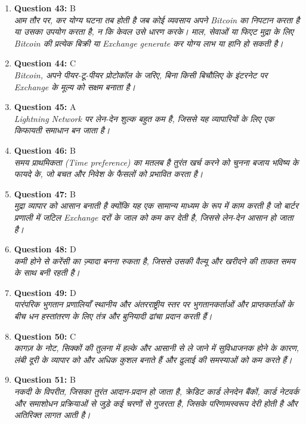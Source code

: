 \documentclass[12pt,a4paper]{article}
\begin{document}
\begin{enumerate}
\item \textbf{Question 43:} B
\\ \textit{आम तौर पर, कर योग्य घटना तब होती है जब कोई व्यवसाय अपने Bitcoin का निपटान करता है या उसका उपयोग करता है, न कि केवल उसे धारण करके। माल, सेवाओं या फिएट मुद्रा के लिए Bitcoin की प्रत्येक बिक्री या Exchange generate कर योग्य लाभ या हानि हो सकती है।}

\item \textbf{Question 44:} C
\\ \textit{Bitcoin, अपने पीयर-टू-पीयर प्रोटोकॉल के जरिए, बिना किसी बिचौलिए के इंटरनेट पर Exchange के मूल्य को सक्षम बनाता है।}

\item \textbf{Question 45:} A
\\ \textit{Lightning Network पर लेन-देन शुल्क बहुत कम है, जिससे यह व्यापारियों के लिए एक किफायती समाधान बन जाता है।}

\item \textbf{Question 46:} B
\\ \textit{समय प्राथमिकता (Time preference) का मतलब है तुरंत खर्च करने को चुनना बजाय भविष्य के फायदे के, जो बचत और निवेश के फैसलों को प्रभावित करता है।}

\item \textbf{Question 47:} B
\\ \textit{मुद्रा व्यापार को आसान बनाती है क्योंकि यह एक सामान्य माध्यम के रूप में काम करती है जो बार्टर प्रणाली में जटिल Exchange दरों के जाल को कम कर देती है, जिससे लेन-देन आसान हो जाता है।}

\item \textbf{Question 48:} D
\\ \textit{कमी होने से करेंसी का ज़्यादा बनना रुकता है, जिससे उसकी वैल्यू और खरीदने की ताकत समय के साथ बनी रहती है।}

\item \textbf{Question 49:} D
\\ \textit{पारंपरिक भुगतान प्रणालियाँ स्थानीय और अंतरराष्ट्रीय स्तर पर भुगतानकर्ताओं और प्राप्तकर्ताओं के बीच धन हस्तांतरण के लिए तंत्र और बुनियादी ढांचा प्रदान करती हैं।}

\item \textbf{Question 50:} C
\\ \textit{कागज़ के नोट, सिक्कों की तुलना में हल्के और आसानी से ले जाने में सुविधाजनक होने के कारण, लंबी दूरी के व्यापार को और अधिक कुशल बनाते हैं और ढुलाई की समस्याओं को कम करते हैं।}

\item \textbf{Question 51:} B
\\ \textit{नकदी के विपरीत, जिसका तुरंत आदान-प्रदान हो जाता है, क्रेडिट कार्ड लेनदेन बैंकों, कार्ड नेटवर्क और समाशोधन प्रक्रियाओं से जुड़े कई चरणों से गुजरता है, जिसके परिणामस्वरूप देरी होती है और अतिरिक्त लागत आती है।}


\end{enumerate}
\end{document}
